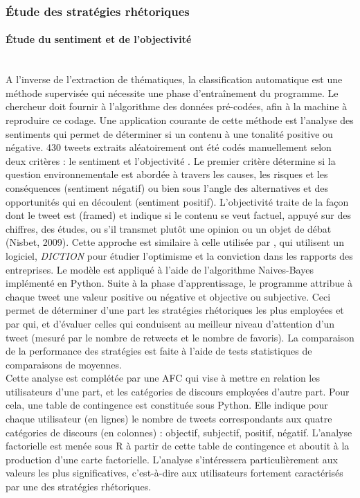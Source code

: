     \subsubsection{Étude des stratégies rhétoriques}
    \label{twitter:strategies}
        \paragraph{Étude du sentiment et de l'objectivité} \ \\
            A l’inverse de l’extraction de thématiques, la classification automatique est une méthode supervisée qui nécessite une phase d’entraînement du programme. Le chercheur doit fournir à l’algorithme des données pré-codées, afin  à la machine à reproduire ce codage. Une application courante de cette méthode est l’analyse des sentiments qui permet de déterminer si un contenu à une tonalité positive ou négative. 430 tweets extraits aléatoirement ont été codés manuellement selon deux critères : le sentiment \parencite{solomon2011private} et l’objectivité \parencite{waldron2016how}. Le premier critère détermine si la question environnementale est abordée à travers les causes, les risques et les conséquences (sentiment négatif) ou bien sous l’angle des alternatives et des opportunités qui en découlent (sentiment positif). L’objectivité traite de la façon dont le tweet est  (framed) et indique si le contenu se veut factuel, appuyé sur des chiffres, des études, ou s’il transmet plutôt une opinion ou un objet de débat (Nisbet, 2009). Cette approche est similaire à celle utilisée par \textcite{cho2010language}, qui utilisent un logiciel, \textit{DICTION} pour étudier l'optimisme et la conviction dans les rapports \rse des entreprises.
            Le modèle est appliqué à l’aide de l’algorithme Naives-Bayes implémenté en Python. Suite à la phase d’apprentissage, le programme attribue à chaque tweet une valeur positive ou négative et objective ou subjective.
            Ceci permet de déterminer d’une part les stratégies rhétoriques les plus employées et par qui, et d’évaluer celles qui conduisent au meilleur niveau d’attention d’un tweet (mesuré par le nombre de retweets et le nombre de favoris). La comparaison de la performance des stratégies est faite à l’aide de tests statistiques de comparaisons de moyennes. \\

            Cette analyse est complétée par une AFC qui vise à mettre en relation les utilisateurs d’une part, et les catégories de discours employées d’autre part. Pour cela, une table de contingence est constituée sous Python. Elle indique pour chaque utilisateur (en lignes) le nombre de tweets correspondants aux quatre catégories de discours (en colonnes) : objectif, subjectif, positif, négatif. L’analyse factorielle est menée sous R à partir de cette table de contingence et aboutit à la production d’une carte factorielle. L’analyse s’intéressera particulièrement aux valeurs les plus significatives, c'est-à-dire aux utilisateurs fortement caractérisés par une des stratégies rhétoriques.

